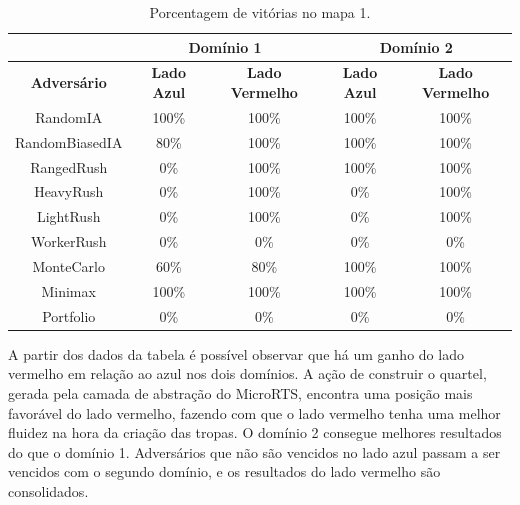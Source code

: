 \begin{table}[ht]
	\centering
	\caption{Porcentagem de vitórias no mapa 1.}
	\label{tab:mapa1}
	\begin{tabular}{|c|cc|cc|}
		\hline
		\textbf{}           & \multicolumn{2}{c|}{\textbf{Domínio 1}}  & \multicolumn{2}{c|}{\textbf{Domínio 2}}  \\ \hline
		\textbf{Adversário} & \textbf{Lado Azul} & \textbf{Lado Vermelho} & \textbf{Lado Azul} & \textbf{Lado Vermelho} \\ \hline
		RandomIA            & 100\%              & 100\%                  & 100\%              & 100\%                  \\ \hline
		RandomBiasedIA      & 80\%               & 100\%                  & 100\%              & 100\%                  \\ \hline
		RangedRush          & 0\%                & 100\%                  & 100\%              & 100\%                  \\ \hline
		HeavyRush           & 0\%                & 100\%                  & 0\%                & 100\%                  \\ \hline
		LightRush           & 0\%                & 100\%                  & 0\%                & 100\%                  \\ \hline
		WorkerRush          & 0\%                & 0\%                    & 0\%                & 0\%                    \\ \hline
		MonteCarlo          & 60\%               & 80\%                   & 100\%              & 100\%                  \\ \hline
		Minimax             & 100\%              & 100\%                  & 100\%              & 100\%                  \\ \hline
		Portfolio           & 0\%                & 0\%                    & 0\%                & 0\%                    \\ \hline
	\end{tabular}
\end{table}

A partir dos dados da tabela é possível observar que há um ganho do lado vermelho em relação ao azul nos dois domínios. 
A ação de construir o quartel, gerada pela camada de abstração do MicroRTS, encontra uma posição mais favorável do lado vermelho, fazendo com que o lado vermelho tenha uma melhor fluidez na hora da criação das tropas.
O domínio 2 consegue melhores resultados do que o domínio 1.
Adversários que não são vencidos no lado azul passam a ser vencidos com o segundo domínio, e os resultados do lado vermelho são consolidados.

